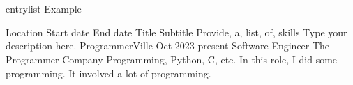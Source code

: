 \section{\faCode}{entrylist Example}
\begin{entrylist}
	\entry
	{Location}
	{Start date}
	{End date} %
	{Title}
	{Subtitle}
	{Provide, a, list, of, skills} %
	{Type your description here.}
	\entry
	{ProgrammerVille}
	{Oct 2023}
	{present} %
	{Software Engineer }
	{The Programmer Company}
	{Programming, Python, C, etc.} %
	{In this role, I did some programming. It involved a lot of programming.}
\end{entrylist}